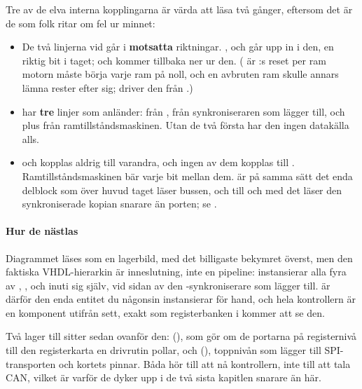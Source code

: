 Tre av de elva interna kopplingarna är värda att läsa två gånger, eftersom det är de som folk ritar
om fel ur minnet:
\begin{itemize}
  \item De två linjerna vid  går i \textbf{motsatta} riktningar. ,
     och  går upp in i den, en riktig bit i taget;  och
     kommer tillbaka ner ur den. ( är :s reset per ram
    \textemdash{} motorn måste börja varje ram på noll, och en avbruten ram skulle annars lämna
    rester efter sig;  driver den från .)
  \item {} har \textbf{tre} linjer som anländer:  från
    ,  från synkroniseraren som  lägger till, och
     plus  från ramtillståndsmaskinen. Utan de två första har den ingen
    datakälla alls.
  \item {} och  kopplas aldrig till varandra, och ingen av dem
    kopplas till . Ramtillståndsmaskinen bär varje bit mellan dem. 
    är på samma sätt det enda delblock som över huvud taget läser bussen, och till och med det läser
    den synkroniserade kopian snarare än porten; se .
\end{itemize}

\paragraph{Hur de nästlas}
Diagrammet läses som en lagerbild, med det billigaste bekymret överst, men den faktiska
VHDL-hierarkin är inneslutning, inte en pipeline:  instansierar alla fyra av
, ,  och  inuti sig själv, vid
sidan av den -synkroniserare som  lägger till.
 är därför den enda entitet du någonsin instansierar för hand, och hela
kontrollern är en komponent utifrån sett, exakt som registerbanken i  kommer att se
den.

Två lager till sitter sedan ovanför den:  (), som gör om de
portarna på registernivå till den registerkarta en drivrutin pollar, och 
(), toppnivån som lägger till SPI-transporten och kortets pinnar. Båda hör till att
nå kontrollern, inte till att tala CAN, vilket är varför de dyker upp i de två sista kapitlen snarare
än här.

